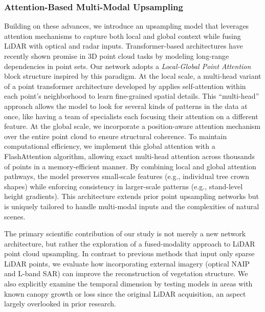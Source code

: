 \documentclass[preprint,12pt,authoryear]{elsarticle}
\begin{document}
\subsubsection{Attention-Based Multi-Modal Upsampling}

Building on these advances, we introduce an upsampling model that leverages attention mechanisms to capture both local and global context while fusing LiDAR with optical and radar inputs. Transformer-based architectures have recently shown promise in 3D point cloud tasks by modeling long-range dependencies in point sets. Our network adopts a \emph{Local-Global Point Attention} block structure inspired by this paradigm. At the local scale, a multi-head variant of a point transformer architecture developed by \citet{zhao2021point} applies self-attention within each point’s neighborhood to learn fine-grained spatial details. This “multi-head” approach allows the model to look for several kinds of patterns in the data at once, like having a team of specialists each focusing their attention on a different feature. At the global scale, we incorporate a position-aware attention mechanism over the entire point cloud to ensure structural coherence. To maintain computational efficiency, we implement this global attention with a FlashAttention \citep{dao2022flashattention} algorithm, allowing exact multi-head attention across thousands of points in a memory-efficient manner. By combining local and global attention pathways, the model preserves small-scale features (e.g., individual tree crown shapes) while enforcing consistency in larger-scale patterns (e.g., stand-level height gradients). This architecture extends prior point upsampling networks but is uniquely tailored to handle multi-modal inputs and the complexities of natural scenes.

The primary scientific contribution of our study is not merely a new network architecture, but rather the exploration of a fused-modality approach to LiDAR point cloud upsampling. In contrast to previous methods that input only sparse LiDAR points, we evaluate how incorporating external imagery (optical NAIP and L-band SAR) can improve the reconstruction of vegetation structure. We also explicitly examine the temporal dimension by testing models in areas with known canopy growth or loss since the original LiDAR acquisition, an aspect largely overlooked in prior research.
\end{document}
